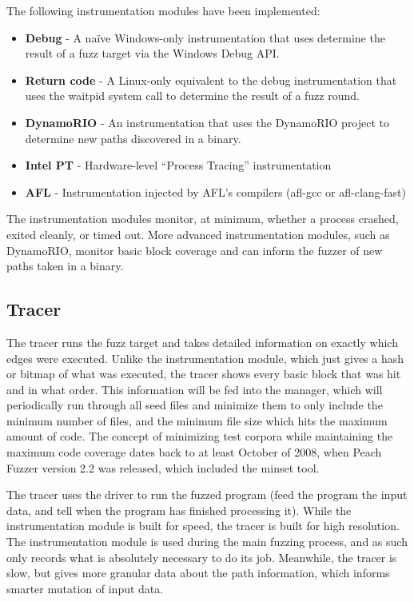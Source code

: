 The following instrumentation modules have been implemented:
\begin{itemize}[noitemsep]
\item \textbf{Debug} - A na\"ive Windows-only instrumentation that uses determine the
	result of a fuzz target via the Windows Debug API.
\item \textbf{Return code} - A Linux-only equivalent to the debug instrumentation that
	uses the waitpid system call to determine the result of a fuzz round.
\item \textbf{DynamoRIO} - An instrumentation that uses the DynamoRIO project to
	determine new paths discovered in a binary.
\item \textbf{Intel PT} - Hardware-level ``Process Tracing'' instrumentation
\item \textbf{AFL} - Instrumentation injected by AFL's compilers (afl-gcc or
	afl-clang-fast)
\end{itemize}

The instrumentation modules monitor, at minimum, whether a process crashed,
exited cleanly, or timed out. More advanced instrumentation modules, such as
DynamoRIO, monitor basic block coverage and can inform the fuzzer of new paths
taken in a binary.

\subsection{Tracer} \label{Tracer}
The tracer runs the fuzz target and takes detailed information on exactly which
edges were executed.  Unlike the instrumentation module, which just gives a
hash or bitmap of what was executed, the tracer shows every basic block that
was hit and in what order.  This information will be fed into the manager,
which will periodically run through all seed files and minimize them to only
include the minimum number of files, and the minimum file size which hits the
maximum amount of code. The concept of minimizing test corpora while
maintaining the maximum code coverage dates back to at least October of 2008,
when Peach Fuzzer version 2.2 was released, which included the minset
tool.\cite{peach22}

The tracer uses the driver to run the fuzzed program (feed the program the
input data, and tell when the program has finished processing it). While the
instrumentation module is built for speed, the tracer is built for high
resolution.  The instrumentation module is used during the main fuzzing
process, and as such only records what is absolutely necessary to do its job.
Meanwhile, the tracer is slow, but gives more granular data about the path
information, which informs smarter mutation of input data.

